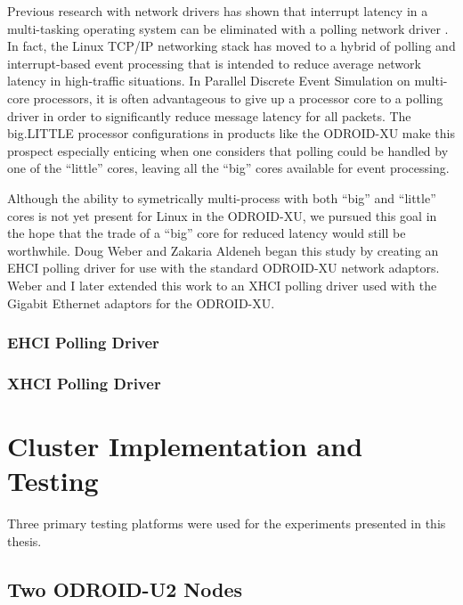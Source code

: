 \documentclass[11pt]{book}
\begin{document}
Previous research with network drivers has shown that interrupt latency in a
multi-tasking operating system can be eliminated with a polling network driver
\cite{dovrolis-01}\cite{liu-09}. In fact, the Linux TCP/IP networking stack has
moved to a hybrid of polling and interrupt-based event processing that is
intended to reduce average network latency in high-traffic situations. In
Parallel Discrete Event Simulation on multi-core processors, it is often
advantageous to give up a processor core to a polling driver in order to
significantly reduce message latency for all packets. The big.LITTLE processor
configurations in products like the ODROID-XU make this prospect especially
enticing when one considers that polling could be handled by one of the
``little'' cores, leaving all the ``big'' cores available for event processing.

Although the ability to symetrically multi-process with both ``big'' and
``little'' cores is not yet present for Linux in the ODROID-XU, we pursued this
goal in the hope that the trade of a ``big'' core for reduced latency would
still be worthwhile. Doug Weber and Zakaria Aldeneh began this study by creating
an EHCI polling driver for use with the standard ODROID-XU network
adaptors. Weber and I later extended this work to an XHCI polling driver used
with the Gigabit Ethernet adaptors for the ODROID-XU.

\subsection{\textbf{EHCI Polling Driver}}


\subsection{\textbf{XHCI Polling Driver}}


\newpage
\chapter{Cluster Implementation and Testing}
\label{cluster}

Three primary testing platforms were used for the experiments presented in this
thesis.

\section{\textbf{Two ODROID-U2 Nodes}}
\end{document}
